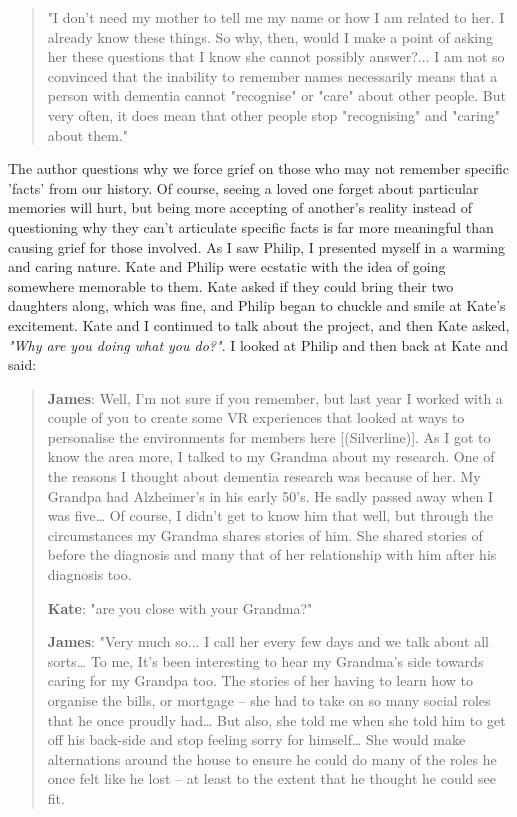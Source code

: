 \begin{quote}
"I don't need my mother to tell me my name or how I am related to her. I already know these things. So why, then, would I make a point of asking her these questions that I know she cannot possibly answer?... I am not so convinced that the inability to remember names necessarily means that a person with dementia cannot "recognise" or "care" about other people. But very often, it does mean that other people stop "recognising" and "caring" about them." \citep{taylor_recognition_2008}
\end{quote}
The author questions why we force grief on those who may not remember specific 'facts' from our history. Of course, seeing a loved one forget about particular memories will hurt, but being more accepting of another's reality instead of questioning why they can't articulate specific facts is far more meaningful than causing grief for those involved. As I saw Philip, I presented myself in a warming and caring nature. Kate and Philip were ecstatic with the idea of going somewhere memorable to them. Kate asked if they could bring their two daughters along, which was fine, and Philip began to chuckle and smile at Kate's excitement. Kate and I continued to talk about the project, and then Kate asked, \textit{"Why are you doing what you do?"}. I looked at Philip and then back at Kate and said:

\begin{quote}
    
\textbf{James}: Well, I'm not sure if you remember, but last year I worked with a couple of you to create some VR experiences that looked at ways to personalise the environments for members here [(Silverline)]. As I got to know the area more, I talked to my Grandma about my research. One of the reasons I thought about dementia research was because of her. My Grandpa had Alzheimer's in his early 50's. He sadly passed away when I was five… Of course, I didn't get to know him that well, but through the circumstances my Grandma shares stories of him. She shared stories of before the diagnosis and many that of her relationship with him after his diagnosis too.

\textbf{Kate}: "are you close with your Grandma?"

\textbf{James}: "Very much so... I call her every few days and we talk about all sorts… To me, It's been interesting to hear my Grandma's side towards caring for my Grandpa too. The stories of her having to learn how to organise the bills, or mortgage – she had to take on so many social roles that he once proudly had… But also, she told me when she told him to get off his back-side and stop feeling sorry for himself… She would make alternations around the house to ensure he could do many of the roles he once felt like he lost – at least to the extent that he thought he could see fit. 
\end{quote}

